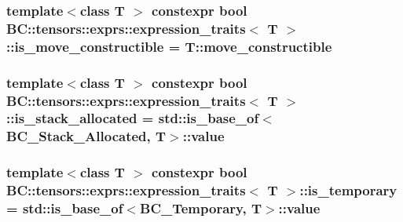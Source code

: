 \subsubsection[{\texorpdfstring{is\+\_\+move\+\_\+constructible}{is_move_constructible}}]{\setlength{\rightskip}{0pt plus 5cm}template$<$class T $>$ constexpr bool {\bf B\+C\+::tensors\+::exprs\+::expression\+\_\+traits}$<$ T $>$\+::is\+\_\+move\+\_\+constructible = T\+::move\+\_\+constructible\hspace{0.3cm}{\ttfamily [static]}}\hypertarget{structBC_1_1tensors_1_1exprs_1_1expression__traits_aa9f262de79c02b4ee44c7cde0dbaa80f}{}\label{structBC_1_1tensors_1_1exprs_1_1expression__traits_aa9f262de79c02b4ee44c7cde0dbaa80f}
\subsubsection[{\texorpdfstring{is\+\_\+stack\+\_\+allocated}{is_stack_allocated}}]{\setlength{\rightskip}{0pt plus 5cm}template$<$class T $>$ constexpr bool {\bf B\+C\+::tensors\+::exprs\+::expression\+\_\+traits}$<$ T $>$\+::is\+\_\+stack\+\_\+allocated = std\+::is\+\_\+base\+\_\+of$<${\bf B\+C\+\_\+\+Stack\+\_\+\+Allocated}, T$>$\+::value\hspace{0.3cm}{\ttfamily [static]}}\hypertarget{structBC_1_1tensors_1_1exprs_1_1expression__traits_a43c094c4c1101ff8959bb21c74b0cd3f}{}\label{structBC_1_1tensors_1_1exprs_1_1expression__traits_a43c094c4c1101ff8959bb21c74b0cd3f}
\subsubsection[{\texorpdfstring{is\+\_\+temporary}{is_temporary}}]{\setlength{\rightskip}{0pt plus 5cm}template$<$class T $>$ constexpr bool {\bf B\+C\+::tensors\+::exprs\+::expression\+\_\+traits}$<$ T $>$\+::is\+\_\+temporary = std\+::is\+\_\+base\+\_\+of$<${\bf B\+C\+\_\+\+Temporary}, T$>$\+::value\hspace{0.3cm}{\ttfamily [static]}}\hypertarget{structBC_1_1tensors_1_1exprs_1_1expression__traits_a931646f14b49daddf77d9f6603b9936a}{}\label{structBC_1_1tensors_1_1exprs_1_1expression__traits_a931646f14b49daddf77d9f6603b9936a}
